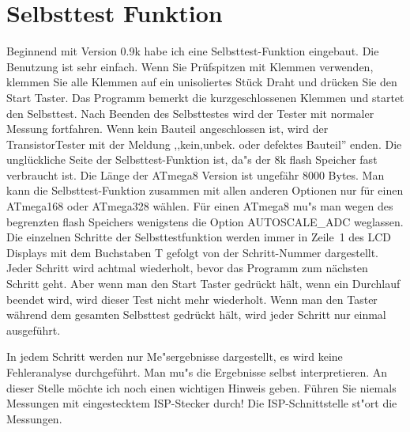 
\section{Selbsttest Funktion}
\label{sec:selftest}
Beginnend mit Version 0.9k habe ich eine Selbsttest-Funktion eingebaut.
Die Benutzung ist sehr einfach.
Wenn Sie Pr\"ufspitzen mit Klemmen verwenden, klemmen Sie alle Klemmen auf ein unisoliertes St\"uck Draht und dr\"ucken Sie
den Start Taster.
Das Programm bemerkt die kurzgeschlossenen Klemmen und startet den Selbsttest.
Nach Beenden des Selbsttestes wird der Tester mit normaler Messung fortfahren.
Wenn kein Bauteil angeschlossen ist, wird der TransistorTester mit der
Meldung ,,kein,unbek. oder defektes Bauteil'' enden.
Die ungl\"uckliche Seite der Selbsttest-Funktion ist, da"s der 8k flash Speicher fast verbraucht ist.
Die L\"ange der ATmega8 Version ist ungef\"ahr 8000 Bytes.
Man kann die Selbsttest-Funktion zusammen mit allen anderen Optionen nur f\"ur einen ATmega168
oder ATmega328 w\"ahlen.
F\"ur einen ATmega8 mu"s man wegen des begrenzten flash Speichers wenigstens die Option AUTOSCALE\_ADC weglassen.
Die einzelnen Schritte der Selbsttestfunktion werden immer in Zeile~1 des LCD Displays mit dem Buchstaben T
gefolgt von der Schritt-Nummer dargestellt.
Jeder Schritt wird achtmal wiederholt, bevor das Programm zum n\"achsten Schritt geht.
Aber wenn man den Start Taster gedr\"uckt h\"alt, wenn ein Durchlauf beendet wird, wird dieser Test nicht
mehr wiederholt.
Wenn man den Taster w\"ahrend dem gesamten Selbsttest gedr\"uckt h\"alt, wird jeder Schritt nur einmal ausgef\"uhrt.

In jedem Schritt werden nur Me"sergebnisse dargestellt, es wird keine Fehleranalyse durchgef\"uhrt.
Man  mu"s die Ergebnisse selbst interpretieren.
An dieser Stelle m\"ochte ich noch einen wichtigen Hinweis geben. F\"uhren Sie niemals Messungen mit
eingestecktem ISP-Stecker durch!
Die ISP-Schnittstelle st"ort die Messungen.

